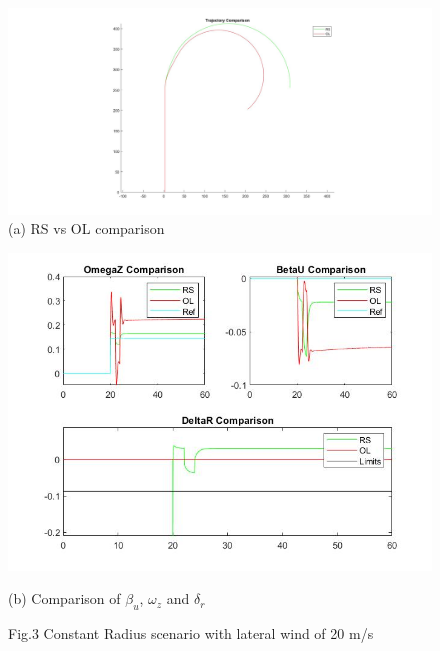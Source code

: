 \begin{figure}[!h]
		\centering
	        \includegraphics[scale=0.25]{./Images/ConstRwind/t} 
                \caption{(a)  RS vs OL comparison}
          
	\end{figure}

\begin{figure}[!h]
		\centering
	        \includegraphics[scale=0.6]{./Images/ConstRwind/s} 
                \caption{(b) Comparison of  $\beta_{u}$, $\omega_{z}$ and $\delta_{r}$}
                \caption {Fig.3 Constant Radius scenario with lateral wind of 20 m/s}
	\end{figure}

